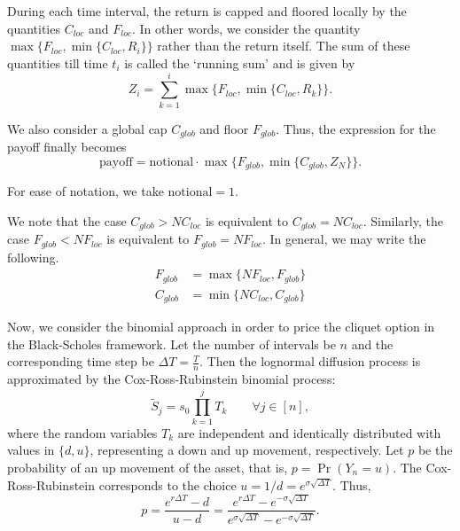 During each time interval, the return is capped and floored locally by the quantities $ C_{loc} $ and $ F_{loc} $. In other words, we consider the quantity $ \max \{ F_{loc}, \min \{ C_{loc}, R_i \} \} $ rather than the return itself. The sum of these quantities till time $t_i$ is called the `running sum' and is given by
\begin{equation}
	\label{eq:clq-rsz}
	Z_i = \sum_{k = 1}^{i} \max \{ F_{loc}, \min \{ C_{loc}, R_k \} \}.
\end{equation}

We also consider a global cap $ C_{glob} $ and floor $ F_{glob} $. Thus, the expression for the payoff finally becomes
\begin{equation}
	\label{eq:clq-rsz}
	\mathrm{payoff} = \mathrm{notional} \cdot \max \{ F_{glob}, \min \{ C_{glob}, Z_{N} \} \}.
\end{equation}

For ease of notation, we take $ \mathrm{notional} = 1 $.

We note that the case $ C_{glob} > N C_{loc} $ is equivalent to $ C_{glob} = N C_{loc} $. Similarly, the case $ F_{glob} < N F_{loc} $ is equivalent to $ F_{glob} = N F_{loc} $. In general, we may write the following.
\begin{subequations}
	\label{eq:clq-update-glob}
	\begin{align*}
		F_{glob} &= \max \{ N F_{loc}, F_{glob} \}  \\
		C_{glob} &= \min \{ N C_{loc}, C_{glob} \}
	\end{align*}
\end{subequations}


Now, we consider the binomial approach in order to price the cliquet option in the Black-Scholes framework. Let the number of intervals be $n$ and the corresponding time step be $ \Delta T = \frac{T}{n} $. Then the lognormal diffusion process is approximated by the Cox-Ross-Rubinstein binomial process:
\begin{equation}
	\label{eq:clq-risky-iid-binom-rvs}
	\tilde{S}_j = s_0 \prod_{k = 1}^j T_k \qquad \forall j \in [n],
\end{equation}
where the random variables $ T_k $ are independent and identically distributed with values in $ \{ d, u \} $, representing a down and up movement, respectively. Let $p$ be the probability of an up movement of the asset, that is, $ p = \Pr( Y_n = u ) $. The Cox-Ross-Rubinstein corresponds to the choice $ u = 1/d = e^{ \sigma \sqrt{ \Delta T } } $. Thus,
\begin{equation}
	\label{eq:clq-pu}
	p = \frac{ e^{r \Delta T} - d }{ u - d } = \frac{ e^{r \Delta T} - e^{ -\sigma \sqrt{ \Delta T } } }{ e^{ \sigma \sqrt{ \Delta T } } - e^{ -\sigma \sqrt{ \Delta T } } }.
\end{equation}

